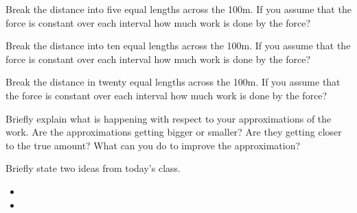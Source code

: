 \begin{problem}
  \begin{subproblem}
  \item Break the distance into five equal lengths across the 100m.
    If you assume that the force is constant over each interval how
    much work is done by the force?  

    \vfill

  \item Break the distance into ten equal lengths across the 100m.  If
    you assume that the force is constant over each interval how much
    work is done by the force?  

    \vfill

    \clearpage

  \item Break the distance in twenty equal lengths across the 100m.  If
    you assume that the force is constant over each interval how much
    work is done by the force?

    \vfill

  \item Briefly explain what is happening with respect to your
    approximations of the work. Are the approximations getting bigger
    or smaller? Are they getting closer to the true amount? What can
    you do to improve the approximation?

    \vspace{3em}

  \end{subproblem}
\end{problem}

\postClass

\begin{problem}
\item Briefly state two ideas from today's class.
  \begin{itemize}
  \item
  \item
  \end{itemize}
\item
  \begin{subproblem}
    \item
  \end{subproblem}
\end{problem}





